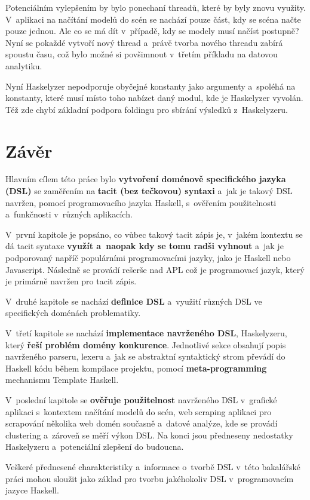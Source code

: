 \documentclass[male, czech]{kithesis}
\begin{document}
Potenciálním vylepšením by bylo ponechaní threadů, 
které by byly znovu využity.
V~aplikaci na načítání modelů do scén se nachází pouze část,
kdy se scéna načte pouze jednou.
Ale co se má dít v~případě, 
kdy se modely musí načíst postupně?
Nyní se pokaždé vytvoří nový thread
a~právě tvorba nového threadu zabírá spoustu času,
což bylo možné si povšimnout v~třetím příkladu na datovou analytiku.

Nyní Haskelyzer nepodporuje obyčejné konstanty jako argumenty
a~spoléhá na konstanty,
které musí místo toho nabízet daný modul, 
kde je Haskelyzer vyvolán.
Též zde chybí základní podpora foldingu pro sbírání výsledků z~Haskelyzeru.

\chapter{Závěr}
Hlavním cílem této práce bylo \textbf{vytvoření doménově specifického jazyka (DSL)} se zaměřením 
na \textbf{tacit (bez tečkovou) syntaxi}
a~jak je takový DSL navržen, 
pomocí programovacího jazyka Haskell, 
s~ověřením použitelnosti a~funkčnosti v~různých aplikacích.

V~první kapitole je popsáno, 
co vůbec takový tacit zápis je,
v~jakém kontextu se dá tacit syntaxe \textbf{využít a~naopak kdy se tomu radši vyhnout}
a~jak je podporovaný napříč populárními programovacími jazyky,
jako je Haskell nebo Javascript. 
Následně se provádí rešerše nad APL což je programovací jazyk,
který je primárně navržen pro tacit zápis.

V~druhé kapitole se nachází \textbf{definice DSL}
a~využití různých DSL ve specifických doménách problematiky.

V~třetí kapitole se nachází \textbf{implementace navrženého DSL}, 
Haskelyzeru, 
který \textbf{řeší problém domény konkurence}.
Jednotlivé sekce obsahují popis navrženého parseru, 
lexeru
a~jak se abstraktní syntaktický strom převádí 
do Haskell kódu během kompilace projektu, 
pomocí \textbf{meta-programming} mechanismu Template Haskell.

V~poslední kapitole se \textbf{ověřuje použitelnost} navrženého DSL
v~grafické aplikaci s~kontextem načítání modelů do scén,
web scraping aplikaci pro scrapování několika web domén současně
a~datové analýze, 
kde se provádí clustering a~zároveň se měří výkon DSL.
Na konci jsou předneseny nedostatky Haskelyzeru
a~potenciální zlepšení do budoucna.

Veškeré přednesené charakteristiky
a~informace o~tvorbě DSL v~této bakalářské práci
mohou sloužit jako základ pro tvorbu jakéhokoliv DSL v~programovacím jazyce Haskell.
\end{document}
